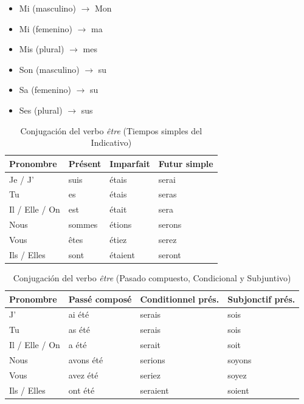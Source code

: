\documentclass[a4paper, 12pt]{article}
\begin{document}
\begin{itemize}
    \item Mi (masculino) $\to $ Mon 
    \item Mi (femenino) $\to $ ma
    \item Mis (plural) $\to $ mes
    \item Son (masculino) $\to $ su 
    \item Sa (femenino) $\to $ su 
    \item Ses (plural) $\to $ sus
\end{itemize}

\begin{table}[htpb]
\centering
\begin{tabular}{|l|l|l|l|}
\hline
\textbf{Pronombre} & \textbf{Présent} & \textbf{Imparfait} & \textbf{Futur simple} \\ \hline
Je / J' & suis & étais & serai \\ \hline
Tu & es & étais & seras \\ \hline
Il / Elle / On & est & était & sera \\ \hline
Nous & sommes & étions & serons \\ \hline
Vous & êtes & étiez & serez \\ \hline
Ils / Elles & sont & étaient & seront \\ \hline
\end{tabular}
\caption{Conjugación del verbo \textit{être} (Tiempos simples del Indicativo)}
\end{table}

\vspace{0.5cm}

\begin{table}[htpb]
\centering
\begin{tabular}{|l|l|l|l|}
\hline
\textbf{Pronombre} & \textbf{Passé composé} & \textbf{Conditionnel prés.} & \textbf{Subjonctif prés.} \\ \hline
J' & ai été & serais & sois \\ \hline
Tu & as été & serais & sois \\ \hline
Il / Elle / On & a été & serait & soit \\ \hline
Nous & avons été & serions & soyons \\ \hline
Vous & avez été & seriez & soyez \\ \hline
Ils / Elles & ont été & seraient & soient \\ \hline
\end{tabular}
\caption{Conjugación del verbo \textit{être} (Pasado compuesto, Condicional y Subjuntivo)}
\end{table}
\end{document}

